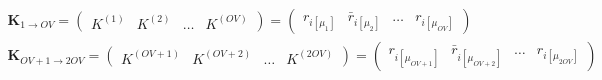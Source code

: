 \begin{align}
\bm{K}_{1\rightarrow OV} = \begin{pmatrix} K^{(1)} & K^{(2)} & \dots & K^{(OV)} \end{pmatrix} = \begin{pmatrix}
r_{i[\mu_1]} & \bar{r}_{i[\mu_2]} & \dots & r_{i[\mu_{OV}]}
\end{pmatrix} \\
\bm{K}_{OV+1\rightarrow 2OV} = \begin{pmatrix} K^{(OV+1)} & K^{(OV+2)} & \dots & K^{(2OV)} \end{pmatrix} = \begin{pmatrix}
r_{i[\mu_{OV+1}]} & \bar{r}_{i[\mu_{OV+2}]} & \dots & r_{i[\mu_{2OV}]}
\end{pmatrix}
\end{align}
